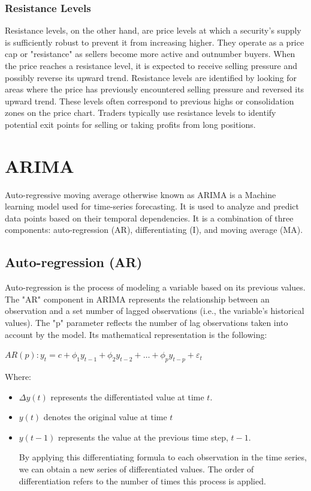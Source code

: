 \documentclass{imc-inf}
\begin{document}
	\subsubsection{Resistance Levels}
	Resistance levels, on the other hand, are price levels at which a security's supply is sufficiently robust to prevent it from increasing higher.
	They operate as a price cap or "resistance" as sellers become more active and outnumber buyers. When the price reaches a resistance level, 
	it is expected to receive selling pressure and possibly reverse its upward trend.
	Resistance levels are identified by looking for areas where the price has previously encountered selling pressure and reversed its upward trend.
	These levels often correspond to previous highs or consolidation zones on the price chart. Traders typically use resistance levels to identify
	potential exit points for selling or taking profits from long positions.
	\section{ARIMA}
	
	Auto-regressive moving average otherwise known as ARIMA is a Machine learning model used  for  time-series forecasting. It is used to analyze and 
	predict data points based on their temporal dependencies. It is a combination of three components: auto-regression (AR), differentiating (I), 
	and moving average (MA). 
	\subsection{Auto-regression (AR)}
	Auto-regression \cite{autoregression} is the process of modeling a variable based on its previous values. The "AR" component in ARIMA
	represents the relationship between an observation and a set number of lagged observations (i.e., the variable's historical values).
	The "p" parameter reflects the number of lag observations taken into account by the model.
	Its mathematical representation is the following:
	
	$AR(p): y_t = c + \phi_1 y_{t-1} + \phi_2 y_{t-2} + \ldots + \phi_p y_{t-p} + \varepsilon_t$
	
	Where:
	\begin{itemize}
		\item $\Delta y(t)$ represents the differentiated value at time $t$.
		
		\item $y(t)$ denotes the original value at time $t$
		\item $y(t-1)$ represents the value at the previous time step, $t-1$.
		
		By applying this differentiating formula to each observation in the time series, we can obtain a new series of differentiated values.
		The order of differentiation refers to the number of times this process is applied. 
	\end{itemize}
	
\end{document}
